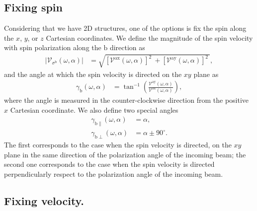 \documentclass[prb,11pt,tightenlines,twocolumn,aps]{revtex4-1}
\begin{document}
\subsection{Fixing spin}\label{sec:theory-fixspin}
Considering that we have 2D structures, one of the options is fix the spin along
the $x$, $y$, or $z$ Cartesian coordinates. We define the magnitude of the spin
velocity with spin polarization along the $\mathrm{b}$ direction as 
\begin{align}
|\mathcal{V}_{\sigma^{\mathrm{b}}}(\omega,\alpha)| 
&=
\sqrt{
[\mathcal{V}^{\mathrm{ax}}(\omega,\alpha)]^{2}\ +
[\mathcal{V}^{\mathrm{ay}}(\omega,\alpha)]^{2}\ 
}, 
\label{eq:vs-mag}
\end{align}
and the angle at which the spin velocity is directed on the $xy$ plane as
\begin{align}
\gamma_{\mathrm{b}} (\omega,\alpha)
&=
\tan^{-1} \left( \frac{\mathcal{V}^{\mathrm{ay}}(\omega,\alpha)}
{\mathcal{V}^{\mathrm{ax}}(\omega,\alpha)} \right),
\label{eq:gamma-ang}
\end{align}
where the angle is measured in the counter-clockwise direction from the positive
$x$ Cartesian coordinate. We also define two special angles
\begin{align}
\gamma_{\mathrm{b \parallel}}(\omega,\alpha) &= \alpha, 
\label{eq:gammapar} 
\\
\gamma_{\mathrm{b \perp}}(\omega,\alpha) &= \alpha \pm 90^{\circ}.
\label{eq:gammaperp}
\end{align}
The first corresponds to the case when the spin velocity is directed, on the
$xy$ plane in the same direction of the polarization angle of the incoming beam;
the second one corresponds to the case when the spin velocity is directed
perpendicularly respect to the polarization angle of the incoming beam.




\subsection{Fixing velocity.}\label{sec:theory-fixvel}
\end{document}
